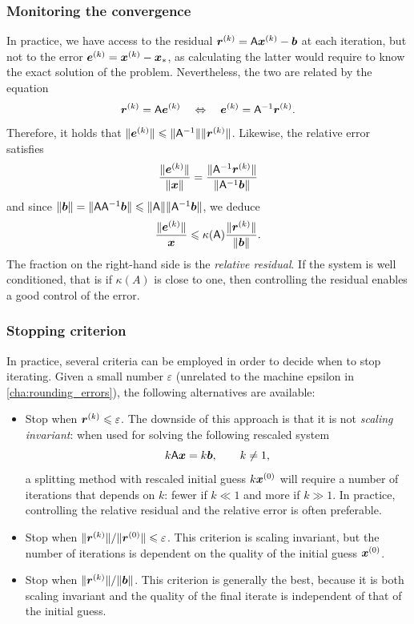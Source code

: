 \subsubsection{Monitoring the convergence}
\label{ssub:monitoring_the_convergence}
In practice,
we have access to the residual $\mathbf{\boldsymbol{r}}^{(k)} = \mathsf A \mathbf{\boldsymbol{x}}^{(k)} - \mathbf{\boldsymbol{b}}$ at each iteration,
but not to the error $\mathbf{\boldsymbol{e}}^{(k)} = \mathbf{\boldsymbol{x}}^{(k)} - \mathbf{\boldsymbol{x}}_*$,
as calculating the latter would require to know the exact solution of the problem.
Nevertheless,
the two are related by the equation
\[
    \mathbf{\boldsymbol{r}}^{(k)} = \mathsf A \mathbf{\boldsymbol{e}}^{(k)}
    \quad \Leftrightarrow \quad \mathbf{\boldsymbol{e}}^{(k)} = \mathsf A^{-1} \mathbf{\boldsymbol{r}}^{(k)}.
\]
Therefore, it holds that $\lVert\mathbf{\boldsymbol{e}}^{(k)}\rVert \leqslant \lVert\mathsf A^{-1}\rVert \lVert\mathbf{\boldsymbol{r}}^{(k)}\rVert$.
Likewise, the relative error satisfies
\[
     \frac{\lVert\mathbf{\boldsymbol{e}}^{(k)}\rVert}{\lVert\mathbf{\boldsymbol{x}}\rVert}
     = \frac{\lVert\mathsf A^{-1} \mathbf{\boldsymbol{r}}^{(k)}\rVert}{\lVert\mathsf A^{-1} \mathbf{\boldsymbol{b}}\rVert}
\]
and since $\lVert\mathbf{\boldsymbol{b}}\rVert = \lVert\mathsf A \mathsf A^{-1} \mathbf{\boldsymbol{b}}\rVert \leqslant \lVert\mathsf A\rVert \lVert\mathsf A^{-1} \mathbf{\boldsymbol{b}}\rVert$,
we deduce
\[
     \frac{\lVert\mathbf{\boldsymbol{e}}^{(k)}\rVert}{\mathbf{\boldsymbol{x}}}
     \leqslant \kappa(\mathsf A) \frac{\lVert\mathbf{\boldsymbol{r}}^{(k)}\rVert}{\lVert\mathbf{\boldsymbol{b}}\rVert}.
\]
The fraction on the right-hand side is the \emph{relative residual}.
If the system is well conditioned,
that is if $\kappa(A)$ is close to one,
then controlling the residual enables a good control of the error.

\subsubsection{Stopping criterion}%
\label{ssub:stopping_criterion}

In practice,
several criteria can be employed in order to decide when to stop iterating.
Given a small number $\varepsilon$ (unrelated to the machine epsilon in \cref{cha:rounding_errors}),
the following alternatives are available:
\begin{itemize}
    \item
        Stop when $\mathbf{\boldsymbol{r}}^{(k)} \leqslant \varepsilon$.
        The downside of this approach is that
        it is not \emph{scaling invariant}:
        when used for solving the following rescaled system
        \[
            k \mathsf A \mathbf{\boldsymbol{x}} = k \mathbf{\boldsymbol{b}}, \qquad k \neq 1,
        \]
        a splitting method with rescaled initial guess $k \mathbf{\boldsymbol{x}}^{(0)}$
        will require a number of iterations that depends on $k$:
        fewer if $k \ll 1$ and more if $k \gg 1$.
        In practice, controlling the relative residual and the relative error is often preferable.

    \item
        Stop when $\lVert\mathbf{\boldsymbol{r}}^{(k)}\rVert / \lVert\mathbf{\boldsymbol{r}}^{(0)}\rVert \leqslant \varepsilon$.
        This criterion is scaling invariant,
        but the number of iterations is dependent on the quality of the initial guess $\mathbf{\boldsymbol{x}}^{(0)}$.

    \item
        Stop when $\lVert\mathbf{\boldsymbol{r}}^{(k)}\rVert / \lVert\mathbf{\boldsymbol{b}}\rVert$.
        This criterion is generally the best,
        because it is both scaling invariant and the quality of the final iterate is independent of that of the initial guess.
\end{itemize}

